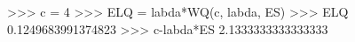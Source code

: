 
>>> c = 4
>>> ELQ = labda*WQ(c, labda, ES)
>>> ELQ
0.1249683991374823
>>> c-labda*ES
2.1333333333333333


